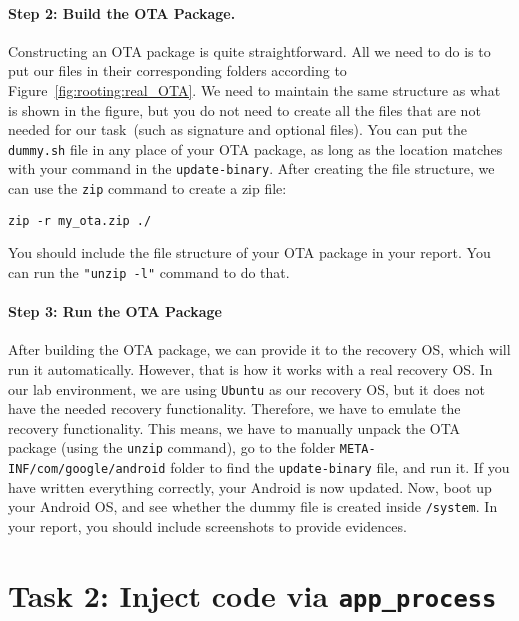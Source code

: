 \paragraph{Step 2: Build the OTA Package.}
Constructing an OTA package is quite straightforward. All we need to do is to put our files in
their corresponding folders according to Figure~\ref{fig:rooting:real_OTA}.
We need to maintain the same structure as what is shown in the figure, but 
you do not need to create all the files that are not needed for our 
task~(such as signature and optional files). 
You can put the \texttt{dummy.sh} file in any place of your 
OTA package, as long as the location matches with your command in 
the \texttt{update-binary}. After creating the file structure, we can use
the \texttt{zip} command to create a zip file:

\begin{lstlisting}
zip -r my_ota.zip ./
\end{lstlisting}

You should include the file structure of your OTA package in your report. You can 
run the \texttt{"unzip -l"} command to do that.



\paragraph{Step 3: Run the OTA Package}
After building the OTA package, we can provide it to the recovery OS, which
will run it automatically. However, that is how it works with a real
recovery OS. In our lab environment, we are using \texttt{Ubuntu} as our
recovery OS, but it does not have the needed recovery functionality.  
Therefore, we have to emulate the recovery functionality. This means, we
have to manually unpack the OTA package (using the \texttt{unzip} command), 
go to the folder 
\texttt{META-INF/com/google/android} folder to find the
\texttt{update-binary} file, and run it.  If you have written everything
correctly, your Android is now updated. Now, boot up your Android OS, and see whether the dummy
file is created inside \texttt{/system}. 
In your report, you should include screenshots to provide evidences. 





\section{Task 2: Inject code via \texttt{app\_process}}


